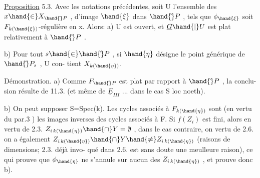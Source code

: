 
\uline{Proposition} 5.3.   Avec les notations précédentes, soit U l'ensemble des
$x\hand{\in} X_{\hand{\check{}}P}$ , d'image $\hand{\xi}$ dans $\hand{\check{}}P$ , tels que $\phi_{\hand{\xi}}$ soit $F_{k(\hand{\xi})}$-régulière en x.  Alors:
a)  U est ouvert, et $\underline{G}\hand{|}U$ est plat relativement à $\hand{\check{}}P$ .

b) Pour tout $s\hand{\in}\hand{\check{}}P$ , si $\hand{\eta}$ désigne le point générique de $\hand{\check{}}P_s$ , U con-%
tient $X_{k(\hand{\eta})}$.

Démonstration. a) Comme $F_{\hand{\check{}}P}$ est  plat par rapport à $\hand{\check{}}P$ , la conclu-%
sion résulte de 11.3. (et même de $\underline{E}_{III}$ ... dans le cas S loc noeth).

b) On peut supposer S=Spec(k). Les cycles associés à $F_{k(\hand{\eta})}$ sont
(en vertu du par.3 ) les images inverses des cycles  associés à F.  Si $f(Z_i)$ est fini, alors en vertu de 2.3. 
$Z_{i\,k(\hand{\eta})}\hand{\cap} Y = \emptyset$ , dans le cas contraire, on vertu de 2.6. on a
également $Z_{i\,k(\hand{\eta})}\hand{\cap} Y \hand{\neq} Z_{i\,k(\hand{\eta})}$ (raisons de dimensions; 2.3. déjà invo-%
qué dans 2.6. est sans doute une meulleure raison), ce qui prouve que $\phi_{\hand{\eta}}$
ne s'annule sur aucun des $Z_{i\,k(\hand{\eta})}$ , et prouve donc b).

